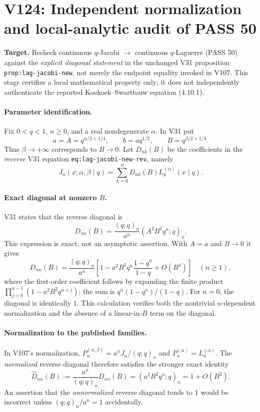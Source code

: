 \documentclass[11pt]{article}
\begin{document}
\clearpage
\section{V124: Independent normalization and local-analytic audit of PASS 50}
\noindent\textbf{Target.} Recheck continuous $q$-Jacobi $\to$ continuous $q$-Laguerre (PASS 50) against the \emph{explicit diagonal statement} in the unchanged V31 proposition \texttt{prop:lag-jacobi-new}, not merely the endpoint equality invoked in V107. This stage certifies a local mathematical property only; it does not independently authenticate the reported Koekoek--Swarttouw equation (4.10.1).

\paragraph{Parameter identification.} Fix $0<q<1$, $n\ge0$, and a real nondegenerate $\alpha$. In V31 put
\[
 a=A=q^{\alpha/2+1/4},\qquad b=aq^{1/2},\qquad B=q^{\beta/2+1/4}.
\]
Thus $\beta\to+\infty$ corresponds to $B\to0$. Let $D_{nk}(B)$ be the coefficients in the \emph{reverse} V31 equation \texttt{eq:lag-jacobi-new-rev}, namely
\[
 J_n(x;\alpha,\beta\mid q)=\sum_{k=0}^nD_{nk}(B)L_k^{(\alpha)}(x\mid q).
\]

\paragraph{Exact diagonal at nonzero $B$.} V31 states that the reverse diagonal is
\[
 \boxed{D_{nn}(B)=\frac{(q;q)_n}{a^n}(A^2B^2q^n;q)_n.}
\]
This expression is exact, not an asymptotic assertion. With $A=a$ and $B\to0$ it gives
\[
 D_{nn}(B)=\frac{(q;q)_n}{a^n}\left[1-a^2B^2q^n\frac{1-q^n}{1-q}+O(B^4)\right]
 \quad(n\ge1),
\]
where the first-order coefficient follows by expanding the finite product
$\prod_{j=0}^{n-1}(1-a^2B^2q^{n+j})$; the sum is $q^n(1-q^n)/(1-q)$. For $n=0$, the diagonal is identically $1$. This calculation verifies both the nontrivial $n$-dependent normalization and the absence of a linear-in-$B$ term on the diagonal.

\paragraph{Normalization to the published families.} In V107's normalization, $P_n^{(\alpha,\beta)}=a^nJ_n/(q;q)_n$ and $P_n^{(\alpha)}=L_n^{(\alpha)}$. The \emph{normalized} reverse diagonal therefore satisfies the stronger exact identity
\begin{equation}\label{eq:v124-normalized-diagonal}
 \boxed{\widehat D_{nn}(B):=\frac{a^n}{(q;q)_n}D_{nn}(B)=(a^2B^2q^n;q)_n=1+O(B^2).}
\end{equation}
An assertion that the \emph{unnormalized} reverse diagonal tends to $1$ would be incorrect unless $(q;q)_n/a^n=1$ accidentally.
\end{document}
